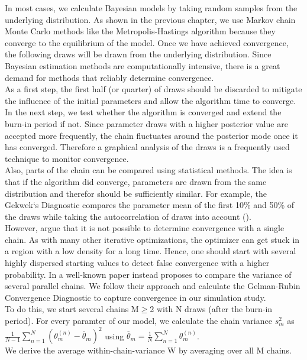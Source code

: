 In most cases, we calculate Bayesian models by taking random samples from the underlying distribution. As shown in the previous chapter, we use Markov chain Monte Carlo methods like the Metropolis-Hastings algorithm because they converge to the equilibrium of the model. Once we have achieved convergence, the following draws will be drawn from the underlying distribution. 
Since Bayesian estimation methods are computationally intensive, there is a great demand for methods that reliably determine convergence.\\
As a first step, the first half (or quarter) of draws should be discarded to mitigate the influence of the initial parameters and allow the algorithm time to converge. In the next step, we test whether the algorithm is converged and extend the burn-in period if not.
Since parameter draws with a higher posterior value are accepted more frequently, the chain fluctuates around the posterior mode once it has converged. Therefore a graphical analysis of the draws is a frequently used technique to monitor convergence.\\
Also, parts of the chain can be compared using statistical methods. The idea is that if the algorithm did converge, parameters are drawn from the same distribution and therefor should be sufficiently similar. For example, the Gekwek`s Diagnostic compares the parameter mean of the first 10\% and 50\% of the draws while taking the autocorrelation of draws into account (\cite{geweke1992}).\\
However, \cite{brooks1998} argue that it is not possible to determine convergence with a single chain. As with many other iterative optimizations, the optimizer can get stuck in a region with a low density for a long time. Hence, one should start with several highly dispersed starting values to detect false convergence with a higher probability. In a well-known paper \cite{gelman1992} instead proposes to compare the variance of several parallel chains.
We follow their approach and calculate the Gelman-Rubin Convergence Diagnostic to capture convergence in our simulation study.\\
To do this, we start several chains M$\geq$2 with N draws (after the burn-in period).
For every paramter of our model, we calculate the chain variance $s_m^2$ as $\frac{1}{N-1}\sum_{n=1}^{N} (\theta_m^{(n)}-\overline{\theta}_m )^2$ using $\overline{\theta}_m=\frac{1}{N} \sum_{n=1}^{N} \theta_m^{(n)}$.\\
We derive the average within-chain-variance W by averaging over all M chains.\\
